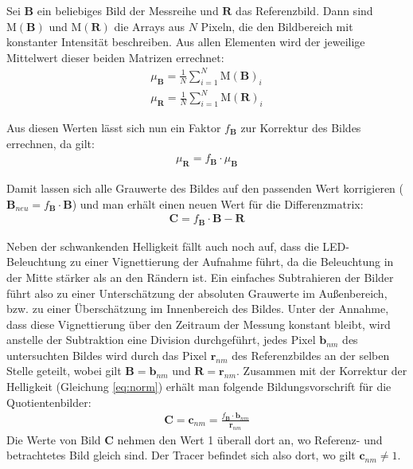 Sei $\mathbf{B}$ ein beliebiges Bild der Messreihe und $\mathbf{R}$ das Referenzbild. Dann sind 
$\mathrm{M(\mathbf{B})}$ und $\mathrm{M(\mathbf{R})}$ die Arrays aus $N$ Pixeln, die den Bildbereich mit konstanter Intensität beschreiben. Aus allen Elementen 
wird der jeweilige Mittelwert dieser beiden Matrizen errechnet:
\begin{eqnarray}
 \mu_{\mathbf{B}} = \frac{1}{N} \sum_{i=1}^N \mathrm{M(\mathbf{B})}_i \\
 \mu_{\mathbf{R}} = \frac{1}{N} \sum_{i=1}^N \mathrm{M(\mathbf{R})}_i
\end{eqnarray}

Aus diesen Werten lässt sich nun ein Faktor $f_{\mathbf{B}}$ zur Korrektur des Bildes errechnen, da gilt:
\begin{eqnarray}
 \mu_{\mathbf{R}} = f_{\mathbf{B}} \cdot \mu_{\mathbf{B}}
 \label{eq:norm}
\end{eqnarray}

Damit lassen sich alle Grauwerte des Bildes auf den passenden Wert korrigieren ($\mathbf{B}_{neu} = f_{\mathbf{B}} \cdot \mathbf{B}$) und man erhält einen neuen Wert für die 
Differenzmatrix:
\begin{eqnarray}
 \mathbf{C} = f_{\mathbf{B}} \cdot \mathbf{B} - \mathbf{R}
\end{eqnarray}


Neben der schwankenden Helligkeit fällt auch noch auf, dass die LED-Beleuchtung zu einer Vignettierung der Aufnahme führt, da die Beleuchtung in der Mitte stärker als an den Rändern ist. Ein einfaches Subtrahieren der Bilder führt also zu einer Unterschätzung der absoluten Grauwerte im Außenbereich, bzw. zu einer Überschätzung im Innenbereich des Bildes.
Unter der Annahme, dass diese Vignettierung über den Zeitraum der Messung konstant bleibt, wird anstelle der Subtraktion eine Division durchgeführt, \dah jedes Pixel $\mathbf{b}_{nm}$ des untersuchten Bildes wird durch das Pixel $\mathbf{r}_{nm}$ des Referenzbildes an der selben Stelle geteilt, wobei gilt $\mathbf{B} = \mathbf{b}_{nm}$ und $\mathbf{R} = \mathbf{r}_{nm}$. Zusammen mit der Korrektur der Helligkeit (Gleichung \ref{eq:norm}) erhält man folgende Bildungsvorschrift für die Quotientenbilder:
\begin{eqnarray}
 \mathbf{C} = \mathbf{c}_{nm} = \frac{f_{\mathbf{B}} \cdot \mathbf{b}_{nm}}{\mathbf{r}_{nm}}
 \label{eq:quot}
\end{eqnarray}
Die Werte von Bild $\mathbf{C}$ nehmen den Wert 1 überall dort an, wo Referenz- und betrachtetes Bild gleich sind. Der Tracer befindet sich also dort, wo gilt 
$\mathbf{c}_{nm} \neq 1$.

